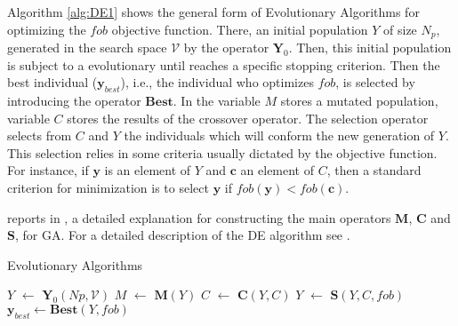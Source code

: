   Algorithm \ref{alg:DE1} shows the general form of Evolutionary Algorithms for 
optimizing the $fob$ objective function. There, an initial population $Y$ of 
size $N_p$, generated in the search space $\mathcal{V}$ by the operator 
$\mathbf{Y}_0$. Then, this initial population is subject to a evolutionary 
until reaches a specific stopping criterion. Then the best individual 
($\mathbf{y}_{best}$), i.e., the individual who optimizes $fob$, is selected by 
introducing the operator $\mathbf{Best}$. 
In  the variable $M$ stores a mutated population, 
variable $C$ stores the results of the crossover operator. The selection
operator selects from $C$ and $Y$ the individuals which will conform the new
generation of $Y$. This selection relies in some criteria 
usually dictated by the objective function. For instance, if $\mathbf{y}$ is an 
element of $Y$ and $\mathbf{c}$ an element of $C$, then a standard criterion 
for minimization is to select  $\mathbf{y}$ if 
$fob(\mathbf{y})<fob(\mathbf{c})$.

\citeauthor{Bagchi1999} reports in \cite{Bagchi1999}, a detailed explanation 
for constructing the main operators $\mathbf{M}$, $\mathbf{C}$ and 
$\mathbf{S}$, for GA. For a detailed description of the DE algorithm see 
\cite{Price_Storn2005}.
%
\begin{algorithm}[htb]
  \caption{Evolutionary Algorithms}
  \label{alg:DE1}
  \begin{algorithmic}
    \State $Y$ $\leftarrow$ $\mathbf{Y}_0(Np,\mathcal{V})$
    \State $M$ $\leftarrow$  $\mathbf{M}(Y)$
    \State $C$ $\leftarrow$  $\mathbf{C}(Y,C)$
    \State $Y$ $\leftarrow$  $\mathbf{S}(Y,C,fob)$ 
    \EndWhile
    \State $\mathbf{y}_{best} \leftarrow \mathbf{Best}(Y, fob)$
  \end{algorithmic}
\end{algorithm}%


